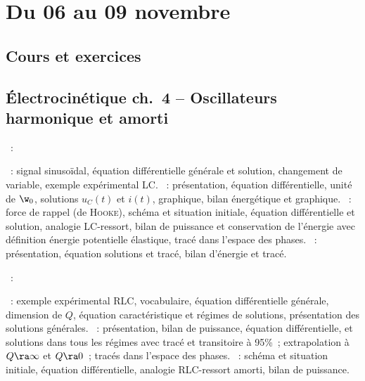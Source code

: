 \documentclass[a4paper, 12pt, final, garamond]{book}
\begin{document}
\setcounter{chapter}{5}

\chapter{Du 06 au 09 novembre}

\section{Cours et exercices}

\section*{Électrocinétique ch.\ 4 -- Oscillateurs harmonique et amorti}
\begin{enumerate}[label=\Roman*]
	~:
	\begin{enumerate}[label=\Alph*]
		~: signal sinusoïdal, équation différentielle
		générale et solution, changement de variable, exemple expérimental LC.
		~: présentation, équation
		différentielle, unité de $\w_0$, solutions $u_C(t)$ et $i(t)$, graphique,
		bilan énergétique et graphique.
    ~: force de rappel (de \textsc{Hooke}),
    schéma et situation initiale, équation différentielle et solution, analogie
    LC-ressort, bilan de puissance et conservation de l'énergie avec définition
    énergie potentielle élastique, tracé dans l'espace des phases.
    ~: présentation, équation solutions
    et tracé, bilan d'énergie et tracé.
	\end{enumerate}
  ~:
	\begin{enumerate}[label=\Alph*]
		~: exemple expérimental RLC, vocabulaire, équation
    différentielle générale, dimension de $Q$, équation caractéristique et
    régimes de solutions, présentation des solutions générales.
		~: présentation, bilan de puissance,
    équation différentielle, et solutions dans tous les régimes avec tracé et
    transitoire à 95\%~; extrapolation à $Q \ra \infty$ et $Q \ra 0$~; tracés
    dans l'espace des phases.
    ~: 
    schéma et situation initiale, équation différentielle, analogie RLC-ressort
    amorti, bilan de puissance.
	\end{enumerate}
\end{enumerate}
\end{document}
